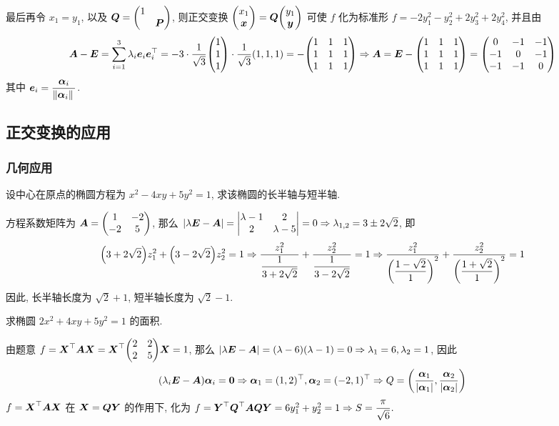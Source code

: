 \begin{solution}
    最后再令 $x_1=y_1$, 以及 $\vb*{Q}=\mqty(1\\&\vb*{P})$, 则正交变换 $\mqty(x_1\\\vb*{x})=\vb*{Q}\mqty(y_1\\\vb*{y})$ 可使 $f$ 化为标准形 $f=-2y_1^2-y_2^2+2y_3^2+2y_4^2$, 并且由
    $$\vb*{A}-\vb*{E}=\sum_{i=1}^{3}\lambda_i\vb*{e}_i\vb*{e}_i^\top=-3\cdot\dfrac{1}{\sqrt{3}}\mqty(1\\1\\1)\cdot\dfrac{1}{\sqrt{3}}(1,1,1)=-\mqty(1&1&1\\1&1&1\\1&1&1)\Rightarrow \vb*{A}=\vb*{E}-\mqty(1&1&1\\1&1&1\\1&1&1)=\mqty(0&-1&-1\\-1&0&-1\\-1&-1&0)$$
    其中 $\vb*{e}_i=\dfrac{\vb*{\alpha}_i}{\norm*{\vb*{\alpha}_i}}$.
\end{solution}

\subsection{正交变换的应用}

\subsubsection{几何应用}

\begin{example}
    设中心在原点的椭圆方程为 $x^2-4xy+5y^2=1$, 求该椭圆的长半轴与短半轴.
\end{example}
\begin{solution}
    方程系数矩阵为 $\vb*{A}=\mqty(1&-2\\-2&5)$, 那么 $|\lambda\vb*{E}-\vb*{A}|=\mqty|\lambda-1 & 2\\2&\lambda-5|=0\Rightarrow \lambda_{1,2}=3\pm 2\sqrt{2}$, 即
    $$\qty(3+2\sqrt{2})z_1^2+\qty(3-2\sqrt{2})z_2^2=1\Rightarrow \dfrac{z_1^2}{\dfrac{1}{3+2\sqrt{2}}}+\dfrac{z_2^2}{\dfrac{1}{3-2\sqrt{2}}}=1\Rightarrow \dfrac{z_1^2}{\qty(\dfrac{1-\sqrt{2}}{1})^2}+\dfrac{z_2^2}{\qty(\dfrac{1+\sqrt{2}}{1})^2}=1$$
    因此, 长半轴长度为 $\sqrt{2}+1$, 短半轴长度为 $\sqrt{2}-1.$
\end{solution}

\begin{example}
    求椭圆 $2x^2+4xy+5y^2=1$ 的面积.
\end{example}
\begin{solution}
    由题意 $f=\vb*{X}^\top\vb*{AX}=\vb*{X}^\top\mqty(2&2\\2&5)\vb*{X}=1$, 那么 $|\lambda \vb*{E}-\vb*{A}|=(\lambda-6)(\lambda-1)=0\Rightarrow \lambda_1=6,\lambda_2=1$, 因此 
    $$(\lambda_i\vb*{E}-\vb*{A})\vb*{\alpha}_i=\vb*{0}\Rightarrow \vb*{\alpha}_1=(1,2)^\top,\vb*{\alpha}_2=(-2,1)^\top\Rightarrow Q=\qty(\dfrac{\vb*{\alpha}_1}{|\vb*{\alpha}_1|},\dfrac{\vb*{\alpha}_2}{|\vb*{\alpha}_2|})$$
    $f=\vb*{X}^\top\vb*{AX}$ 在 $\vb*{X}=\vb*{QY}$ 的作用下, 化为 $f=\vb*{Y}^\top\vb*{Q}^\top\vb*{AQY}=6y_1^2+y_2^2=1\Rightarrow S=\dfrac{\pi}{\sqrt{6}}.$
\end{solution}

